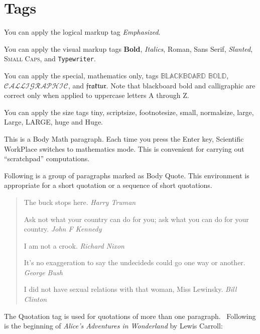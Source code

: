 \documentclass[11pt,spanish]{report}
\begin{document}
\section{Tags}

You can apply the logical markup tag \emph{Emphasized}.

You can apply the visual markup tags \textbf{Bold}, \textit{Italics},
\textrm{Roman}, \textsf{Sans Serif}, \textsl{Slanted}, \textsc{Small Caps},
and \texttt{Typewriter}.

You can apply the special, mathematics only, tags $\mathbb{BLACKBOARD}$
$\mathbb{BOLD}$, $\mathcal{CALLIGRAPHIC}$, and $\mathfrak{fraktur}$. Note that
blackboard bold and calligraphic are correct only when applied to uppercase
letters A through Z.

You can apply the size tags {\tiny tiny}, {\scriptsize scriptsize},
{\footnotesize footnotesize}, {\small small}, {\normalsize normalsize},
{\large large}, {\Large Large}, {\LARGE LARGE}, {\huge huge} and {\Huge Huge}.

This is a Body Math paragraph. Each time you press the Enter key, Scientific
WorkPlace switches to mathematics mode. This is convenient for carrying out
``scratchpad'' computations.

Following is a group of paragraphs marked as Body Quote. This environment is
appropriate for a short quotation or a sequence of short quotations.

\begin{quote}
The buck stops here. \emph{Harry Truman}

Ask not what your country can do for you; ask what you can do for your
country. \emph{John F Kennedy}

I am not a crook. \emph{Richard Nixon}

It's no exaggeration to say the undecideds could go one way or another.
\emph{George Bush}

I did not have sexual relations with that woman, Miss Lewinsky. \emph{Bill Clinton}
\end{quote}

The Quotation tag is used for quotations of more than one paragraph.
\ Following is the beginning of \emph{Alice's Adventures in Wonderland }by
Lewis Carroll:
\end{document}

